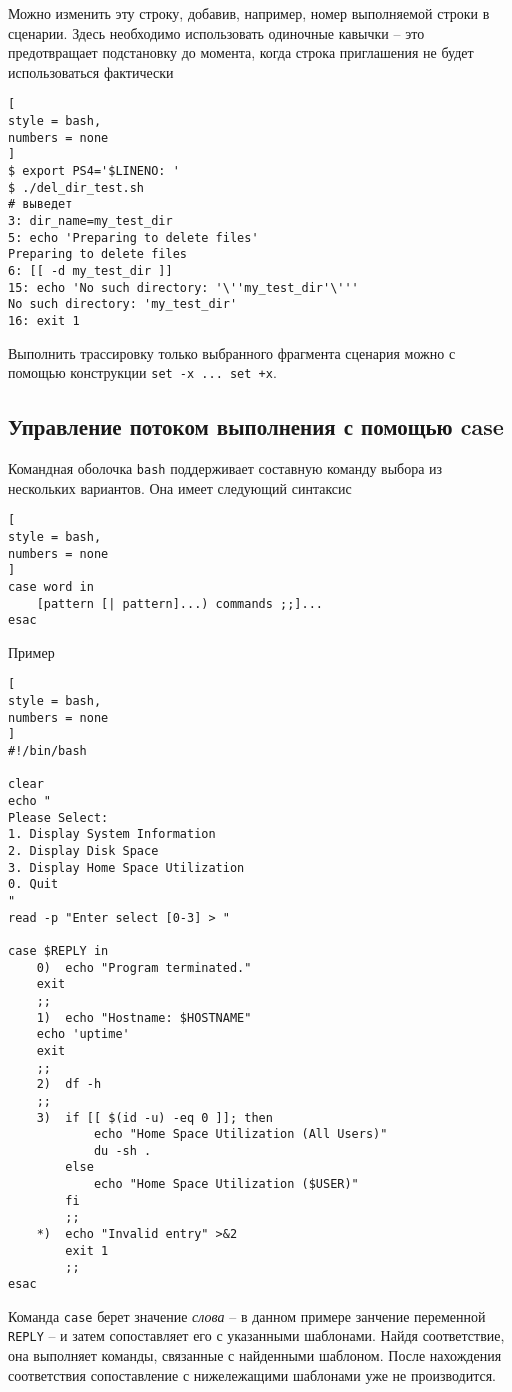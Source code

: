 \documentclass[%
	11pt,
	a4paper,
	utf8,
		]{article}
\begin{document}
Можно изменить эту строку, добавив, например, номер выполняемой строки в сценарии. Здесь необходимо использовать одиночные кавычки -- это предотвращает подстановку до момента, когда строка приглашения не будет использоваться фактически
\begin{lstlisting}[
style = bash,
numbers = none
]
$ export PS4='$LINENO: '
$ ./del_dir_test.sh
# выведет
3: dir_name=my_test_dir
5: echo 'Preparing to delete files'
Preparing to delete files
6: [[ -d my_test_dir ]]
15: echo 'No such directory: '\''my_test_dir'\'''
No such directory: 'my_test_dir'
16: exit 1
\end{lstlisting}

Выполнить трассировку только выбранного фрагмента сценария можно с помощью конструкции \verb|set -x ... set +x|.

\subsection{Управление потоком выполнения с помощью case}

Командная оболочка \texttt{bash} поддерживает составную команду выбора из нескольких вариантов. Она имеет следующий синтаксис
\begin{lstlisting}[
style = bash,
numbers = none
]
case word in
    [pattern [| pattern]...) commands ;;]...
esac
\end{lstlisting}

Пример
\begin{lstlisting}[
style = bash,
numbers = none
]
#!/bin/bash

clear
echo "
Please Select:
1. Display System Information
2. Display Disk Space
3. Display Home Space Utilization
0. Quit
"
read -p "Enter select [0-3] > "

case $REPLY in
    0)	echo "Program terminated."
    exit
    ;;
    1)	echo "Hostname: $HOSTNAME"
    echo 'uptime'
    exit
    ;;
    2)	df -h
    ;;
    3)	if [[ $(id -u) -eq 0 ]]; then
            echo "Home Space Utilization (All Users)"
            du -sh .
        else
            echo "Home Space Utilization ($USER)"
        fi
        ;;
    *)	echo "Invalid entry" >&2
        exit 1
        ;;
esac
\end{lstlisting}

Команда \texttt{case} берет значение \emph{слова} -- в данном примере занчение переменной \texttt{REPLY} -- и затем сопоставляет его с указанными шаблонами. Найдя соответствие, она выполняет команды, связанные с найденными шаблоном. После нахождения соответствия сопоставление с нижележащими шаблонами уже не производится.
\end{document}
